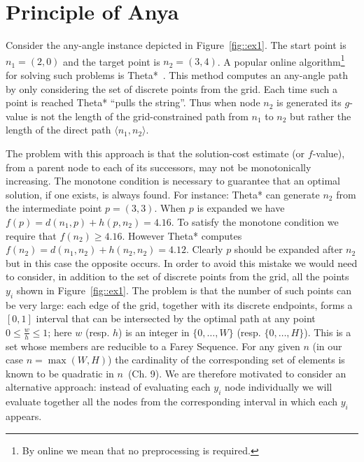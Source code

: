 \section{Principle of Anya}
Consider the any-angle instance depicted in Figure~\ref{fig::ex1}. 
The start point is $n_1 = (2, 0)$ and the target
point is $n_2 = (3, 4)$.  A popular online algorithm\footnote{By online we mean that
no preprocessing is required.}
for solving such problems is Theta*~\cite{nash07}. This method computes
an any-angle path by only considering the set of discrete points from 
the grid. 
Each time such a point is reached Theta* ``pulls the string''.  
Thus when node $n_2$ is generated its $g$-value is not
the length of the grid-constrained path from $n_1$ to $n_2$
but rather the length of the direct path $\langle n_1, n_2 \rangle$.

%    

The problem with this approach is that the solution-cost estimate
(or $f$-value), from a parent node to each of its successors, may 
not be monotonically increasing.  The monotone condition is
necessary to guarantee that an optimal solution, if one exists, is always found.
For instance: Theta* can generate $n_2$ from the intermediate point $p = (3,3)$.
When $p$ is expanded we have $f(p) = d(n_1, p) + h(p, n_2) = 4.16$. 
To satisfy the monotone condition we require that $f(n_2) \geq 4.16$. However 
Theta* computes $f(n_2) = d(n_1, n_2) + h(n_2, n_2) = 4.12$.
Clearly $p$ should be expanded after $n_2$ but in this case the opposite occurs.  
In order to avoid this mistake we would need to consider, in addition to the
set of discrete points from the grid, all the points $y_i$ shown in Figure~\ref{fig::ex1}.
The problem is that the number of such points can be very large:
each edge of the grid, together with its discrete endpoints, 
forms a $[0, 1]$ interval that can be intersected by the optimal
path at any point $0 \leq \frac{w}{h} \leq 1$; here $w$ (resp. $h$) is an integer in
$\{0,\dots,W\}$ (resp.  $\{0,\dots,H\}$).
This is a set whose members are reducible to a Farey Sequence.
For any given $n$ (in our case $n = \max(W, H)$) the cardinality of the corresponding 
set of elements is known to be quadratic in $n$~\cite{concrete89}(Ch. 9).
We are therefore motivated to consider an alternative approach: instead
of evaluating each $y_i$ node individually we will evaluate together
all the nodes from the corresponding interval in which each $y_i$ appears.


